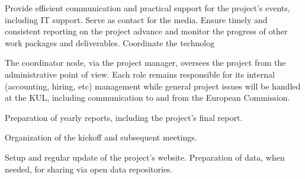 \begin{workpackage}[id=management,type=MGT,wphases=0-48!.2,
  title=Project Management,short=Management,
  lead=KUL,KULRM=24]

\begin{wpobjectives}

Provide efficient communication and practical support for the project's events,
including IT support.
%
Serve as contact for the media.
%
Ensure timely and consistent reporting on the project advance and monitor the
progress of other work packages and deliverables.
%
Coordinate the technolog

\end{wpobjectives}

\begin{wpdescription}

The coordinator node, via the project manager, oversees the project from the
administrative point of view. Each role remains responsible for its internal
(accounting, hiring, etc) management while general project issues will be
handled at the KUL, including communication to and from the European Commission.

\end{wpdescription}

\begin{tasklist}
\begin{task}[title=Reporting,id=mgt-reporting,lead=KUL,PM=6,wphases=0-48!0.125]

Preparation of yearly reports, including the project's final report.

\end{task}

\begin{task}[title=Meetings,id=mgt-meetings,lead=KUL,PM=6,wphases=0-48!0.125]

Organization of the kickoff and subsequent meetings.

\end{task}

\begin{task}[title=IT,id=mgt-IT,lead=KUL,PM=6,wphases=0-48!0.125]

Setup and regular update of the project's website.
%
Preparation of data, when needed, for sharing via open data repositories.

\end{task}

\begin{task}[title=comm,id=mgt-comm,lead=KUL,PM=6,wphases=0-48!0.125]


\end{task}
\end{tasklist}
\end{workpackage}
